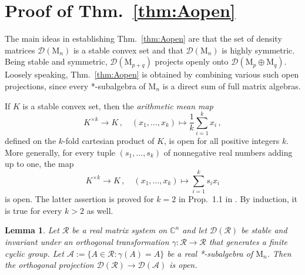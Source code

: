 \documentclass[a4paper,11pt,reqno]{amsart}
\newcommand{\C}{\mathbb{C}}
\newcommand{\M}{\mathrm{M}}
\newcommand{\cA}{\mathcal{A}}
\newcommand{\cD}{\mathcal{D}}
\newcommand{\cR}{\mathcal{R}}
\newtheorem{lem}[thm]{Lemma}
\theoremstyle{definition}
\theoremstyle{remark}
\numberwithin{equation}{section}
\begin{document}
\section{Proof of Thm.~\ref{thm:Aopen}}
\label{sec:proof-thm}
%
The main ideas in establishing Thm.~\ref{thm:Aopen} are that the set of density 
matrices $\cD(\M_n)$ is a stable convex set and that $\cD(\M_n)$ is highly 
symmetric. Being stable and symmetric, $\cD(\M_{p+q})$ projects openly onto 
$\cD(\M_p\oplus\M_q)$. Loosely speaking, Thm.~\ref{thm:Aopen} is obtained by 
combining various such open projections, since every *-subalgebra of $\M_n$ 
is a direct sum of full matrix algebras.
\par
%
If $K$ is a stable convex set, then the \emph{arithmetic mean map}
\[\textstyle
K^{\times k}\to K\,,
\quad
(x_1,\dots,x_k)\mapsto\frac{1}{k}\sum_{i=1}^k x_i\,,
\]
defined on the $k$-fold cartesian product of $K$, is open for all positive 
integers $k$. More generally, for every tuple $(s_1,\dots,s_k)$ of 
nonnegative real numbers adding up to one, the map
\[\textstyle
K^{\times k}\to K\,,
\quad
(x_1,\dots,x_k)\mapsto\sum_{i=1}^k s_i x_i
\]
is open. The latter assertion is proved for $k=2$ in Prop.~1.1 in 
\cite{ClausingPapadopoulou1978}. By induction, it is true for every 
$k>2$ as well.
\par
%
\begin{lem}\label{lem:cyclic-group}
Let $\cR$ be a real matrix system on $\C^n$ and let $\cD(\cR)$ be stable
and invariant under an orthogonal transformation $\gamma:\cR\to\cR$ that 
generates a finite cyclic group. Let $\cA:=\{A\in\cR:\gamma(A)=A\}$ be a 
real *-subalgebra of $\M_n$. Then the orthogonal projection 
$\cD(\cR)\to\cD(\cA)$ is open. 
\end{lem}
%
\end{document}
